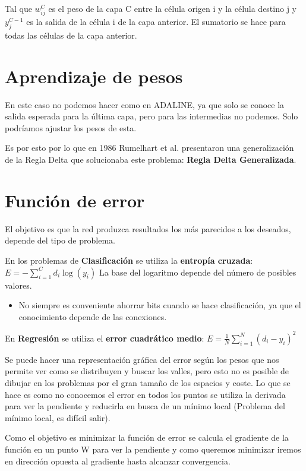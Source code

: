 \documentclass[12pt, twoside, openright]{report} %
\begin{document}
Tal que $w^C_{ij}$ es el peso de la capa C entre la célula origen i y la célula destino j y $y^{C-1}_j$ es la salida de la célula i de la capa anterior. El sumatorio se hace para todas las células de la capa anterior.

\section{Aprendizaje de pesos}
En este caso no podemos hacer como en ADALINE, ya que solo se conoce la salida esperada para la última capa, pero para las intermedias no podemos. Solo podríamos ajustar los pesos de esta. 

Es por esto por lo que en 1986 Rumelhart et al. presentaron una generalización de la Regla Delta que solucionaba este problema: \textbf{Regla Delta Generalizada}.

\section{Función de error}
El objetivo es que la red produzca resultados los más parecidos a los deseados, depende del tipo de problema.
\pagebreak

En los problemas de \textbf{Clasificación} se utiliza la \textbf{entropía cruzada}: $E=-\sum^C_{i=1}d_i \log (y_i)$ La base del logaritmo depende del número de posibles valores.
\begin{itemize}
	\item No siempre es conveniente ahorrar bits cuando se hace clasificación, ya que el conocimiento depende de las conexiones.
\end{itemize}

En \textbf{Regresión} se utiliza el \textbf{error cuadrático medio}: $E=\frac 1 N \sum^N_{i=1} (d_i-y_i)^2$

Se puede hacer una representación gráfica del error según los pesos que nos permite ver como se distribuyen y buscar los valles, pero esto no es posible de dibujar en los problemas por el gran tamaño de los espacios y coste. Lo que se hace es como no conocemos el error en todos los puntos se utiliza la derivada para ver la pendiente y reducirla en busca de un mínimo local (Problema del mínimo local, es difícil salir).

Como el objetivo es minimizar la función de error se calcula el gradiente de la función en un punto W para ver la pendiente y como queremos minimizar iremos en dirección opuesta al gradiente hasta alcanzar convergencia.
\end{document}
